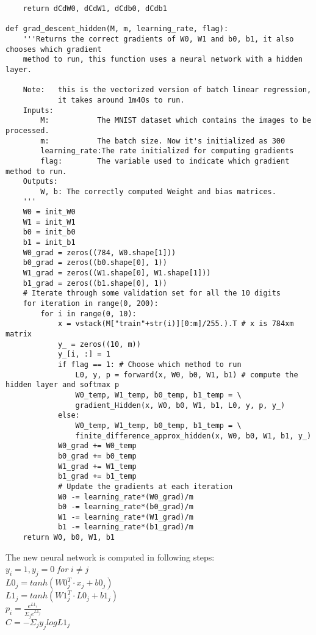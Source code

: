 \documentclass{article}
\begin{document}
\begin{lstlisting}
    return dCdW0, dCdW1, dCdb0, dCdb1

def grad_descent_hidden(M, m, learning_rate, flag):
    '''Returns the correct gradients of W0, W1 and b0, b1, it also chooses which gradient 
    method to run, this function uses a neural network with a hidden layer.
    
    Note:   this is the vectorized version of batch linear regression, 
            it takes around 1m40s to run.
    Inputs:
        M:           The MNIST dataset which contains the images to be processed.
        m:           The batch size. Now it's initialized as 300
        learning_rate:The rate initialized for computing gradients
        flag:        The variable used to indicate which gradient method to run.
    Outputs:
        W, b: The correctly computed Weight and bias matrices.
    '''
    W0 = init_W0
    W1 = init_W1
    b0 = init_b0
    b1 = init_b1
    W0_grad = zeros((784, W0.shape[1]))
    b0_grad = zeros((b0.shape[0], 1))    
    W1_grad = zeros((W1.shape[0], W1.shape[1]))
    b1_grad = zeros((b1.shape[0], 1))
    # Iterate through some validation set for all the 10 digits
    for iteration in range(0, 200):
        for i in range(0, 10):
            x = vstack(M["train"+str(i)][0:m]/255.).T # x is 784xm matrix
            y_ = zeros((10, m))
            y_[i, :] = 1
            if flag == 1: # Choose which method to run
                L0, y, p = forward(x, W0, b0, W1, b1) # compute the hidden layer and softmax p
                W0_temp, W1_temp, b0_temp, b1_temp = \
                gradient_Hidden(x, W0, b0, W1, b1, L0, y, p, y_)
            else:
                W0_temp, W1_temp, b0_temp, b1_temp = \
                finite_difference_approx_hidden(x, W0, b0, W1, b1, y_)
            W0_grad += W0_temp
            b0_grad += b0_temp
            W1_grad += W1_temp
            b1_grad += b1_temp
            # Update the gradients at each iteration
            W0 -= learning_rate*(W0_grad)/m
            b0 -= learning_rate*(b0_grad)/m
            W1 -= learning_rate*(W1_grad)/m
            b1 -= learning_rate*(b1_grad)/m
    return W0, b0, W1, b1
\end{lstlisting}
\indent The new neural network is computed in following steps:\\
\indent \indent \indent $y_i = 1, y_j = 0$ \textit{for} $i\neq j$\\
\indent \indent \indent $L0_j = tanh(W0_j^T\cdot x_j+b0_j)$\\
\indent \indent \indent $L1_j = tanh(W1_j^T\cdot L0_j+b1_j)$\\
\indent \indent \indent $p_i = \frac{e^{L1_i}}{\Sigma_{j}e^{L1_j}}$\\
\indent \indent \indent $C = -\Sigma_{j}y_jlog L1_j$
\end{document}
